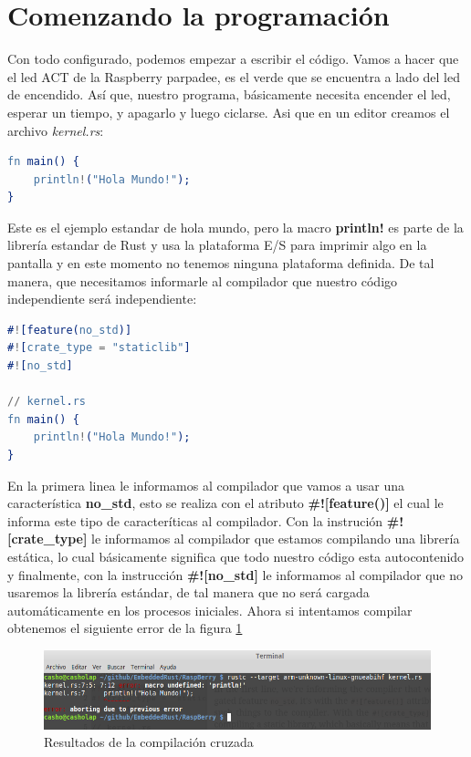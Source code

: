 \documentclass[12pt, twoside]{report}
\begin{document}
\section{Comenzando la programación}

Con todo configurado, podemos empezar a escribir el código. Vamos a hacer que el led ACT de la Raspberry parpadee, es el verde que se encuentra a lado del led de encendido. Así que, nuestro programa, básicamente necesita encender el led, esperar un tiempo, y apagarlo y luego ciclarse. Asi que en un editor creamos el archivo \emph{kernel.rs}:

\begin{lstlisting}[language=erlang]
fn main() {
	println!("Hola Mundo!");
}
\end{lstlisting}

Este es el ejemplo estandar de hola mundo, pero la macro \textbf{println!} es parte de la librería estandar de Rust y usa la plataforma E/S para imprimir algo en la pantalla y en este momento no tenemos ninguna plataforma definida. De tal manera, que necesitamos informarle al compilador que nuestro código independiente será independiente:

\begin{lstlisting}[language=erlang]
#![feature(no_std)]
#![crate_type = "staticlib"]
#![no_std]

// kernel.rs
fn main() {  
    println!("Hola Mundo!");
}
\end{lstlisting}

En la primera linea le informamos al compilador que vamos a usar una característica \textbf{no\_std}, esto se realiza con el atributo  \textbf{\#![feature()]} el cual le informa este tipo de caracteríticas al compilador. Con la instrución \textbf{\#![crate\_type]} le informamos al compilador que estamos compilando una librería estática, lo cual básicamente significa que todo nuestro código esta autocontenido y finalmente, con la instrucción \textbf{\#![no\_std]} le informamos al compilador que no usaremos la librería estándar, de tal manera que no será cargada automáticamente en los procesos iniciales. Ahora si intentamos compilar obtenemos el siguiente error de la figura \ref{fig0001}

\begin{figure}
	\centering
	\includegraphics[width=1\linewidth]{rust_kernel1.png}
	\caption{Resultados de la compilación cruzada}
	\label{fig0001}
\end{figure}
\end{document}

